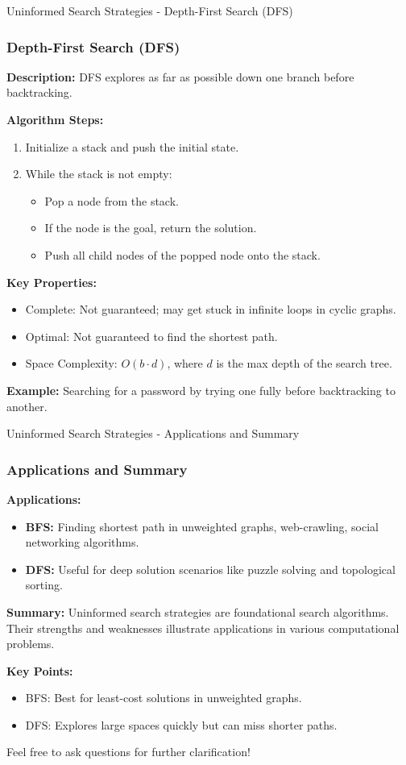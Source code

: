 \documentclass[aspectratio=169]{beamer}
\begin{document}
\begin{frame}[fragile]{Uninformed Search Strategies - Depth-First Search (DFS)}
    \frametitle{Depth-First Search (DFS)}
    
    \textbf{Description:}  
    DFS explores as far as possible down one branch before backtracking.

    \textbf{Algorithm Steps:}
    \begin{enumerate}
        \item Initialize a stack and push the initial state.
        \item While the stack is not empty:
        \begin{itemize}
            \item Pop a node from the stack.
            \item If the node is the goal, return the solution.
            \item Push all child nodes of the popped node onto the stack.
        \end{itemize}
    \end{enumerate}

    \textbf{Key Properties:}
    \begin{itemize}
        \item Complete: Not guaranteed; may get stuck in infinite loops in cyclic graphs.
        \item Optimal: Not guaranteed to find the shortest path.
        \item Space Complexity: \(O(b \cdot d)\), where \(d\) is the max depth of the search tree.
    \end{itemize}

    \textbf{Example:}  
    Searching for a password by trying one fully before backtracking to another.
\end{frame}

\begin{frame}[fragile]{Uninformed Search Strategies - Applications and Summary}
    \frametitle{Applications and Summary}

    \textbf{Applications:}
    \begin{itemize}
        \item \textbf{BFS:} Finding shortest path in unweighted graphs, web-crawling, social networking algorithms.
        \item \textbf{DFS:} Useful for deep solution scenarios like puzzle solving and topological sorting.
    \end{itemize}

    \textbf{Summary:}
    Uninformed search strategies are foundational search algorithms. Their strengths and weaknesses illustrate applications in various computational problems.

    \textbf{Key Points:}
    \begin{itemize}
        \item BFS: Best for least-cost solutions in unweighted graphs.
        \item DFS: Explores large spaces quickly but can miss shorter paths.
    \end{itemize}

    Feel free to ask questions for further clarification!
\end{frame}
\end{document}
